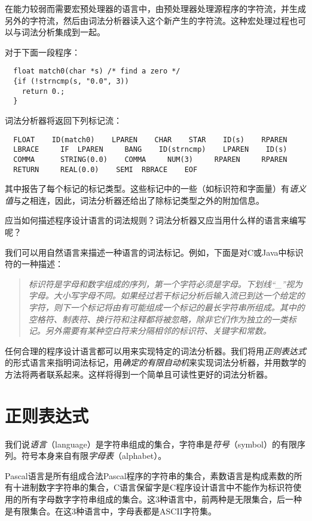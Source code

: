 \documentclass[cn,11pt,chinese]{elegantbook}
\begin{document}
在能力较弱而需要宏预处理器的语言中，由预处理器处理源程序的字符流，并生成另外的字符流，然后由词法分析器读入这个新产生的字符流。这种宏处理过程也可以与词法分析集成到一起。

对于下面一段程序：

\begin{verbatim}
  float match0(char *s) /* find a zero */
  {if (!strncmp(s, "0.0", 3))
    return 0.;
  }
\end{verbatim}

词法分析器将返回下列标记流：

\begin{verbatim}
  FLOAT    ID(match0)    LPAREN    CHAR    STAR    ID(s)    RPAREN
  LBRACE     IF  LPAREN     BANG    ID(strncmp)    LPAREN    ID(s)
  COMMA      STRING(0.0)    COMMA     NUM(3)     RPAREN     RPAREN
  RETURN     REAL(0.0)    SEMI  RBRACE    EOF
\end{verbatim}

其中报告了每个标记的标记类型。这些标记中的一些（如标识符和字面量）有\textit{语义值}与之相连，因此，词法分析器还给出了除标记类型之外的附加信息。

应当如何描述程序设计语言的词法规则？词法分析器又应当用什么样的语言来编写呢？

我们可以用自然语言来描述一种语言的词法标记。例如，下面是对C或Java中标识符的一种描述：

\begin{quote}
  \textit{标识符是字母和数字组成的序列，第一个字符必须是字母。下划线“\_”视为字母。大小写字母不同。如果经过若干标记分析后输入流已到达一个给定的字符，则下一个标记将由有可能组成一个标记的最长字符串所组成。其中的空格符、制表符、换行符和注释都将被忽略，除非它们作为独立的一类标记。另外需要有某种空白符来分隔相邻的标识符、关键字和常数。}
\end{quote}

任何合理的程序设计语言都可以用来实现特定的词法分析器。我们将用\textit{正则表达式}的形式语言来指明词法标记，用\textit{确定的有限自动机}来实现词法分析器，并用数学的方法将两者联系起来。这样将得到一个简单且可读性更好的词法分析器。

\section{正则表达式}

我们说\textit{语言}（language）是字符串组成的集合，字符串是\textit{符号}（symbol）的有限序列。符号本身来自有限\textit{字母表}（alphabet）。

Pascal语言是所有组成合法Pascal程序的字符串的集合，素数语言是构成素数的所有十进制数字字符串的集合，C语言保留字是C程序设计语言中不能作为标识符使用的所有字母数字字符串组成的集合。这3种语言中，前两种是无限集合，后一种是有限集合。在这3种语言中，字母表都是ASCII字符集。
\end{document}
